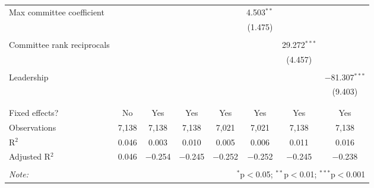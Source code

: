 \documentclass{article}
\begin{document}
\begin{table}[!htbp]
{{\begin{tabular}{@{\extracolsep{5pt}}lccccccc}
         Max committee coefficient &  &  &  &  & 4.503$^{**}$ &  &  \\ 
          &  &  &  &  & (1.475) &  &  \\ 
          & & & & & & & \\ 
         Committee rank reciprocals &  &  &  &  &  & 29.272$^{***}$ &  \\ 
          &  &  &  &  &  & (4.457) &  \\ 
          & & & & & & & \\ 
         Leadership &  &  &  &  &  &  & $-$81.307$^{***}$ \\ 
          &  &  &  &  &  &  & (9.403) \\ 
          & & & & & & & \\ 
        \hline \\[-1.8ex] 
        Fixed effects? & No & Yes & Yes & Yes & Yes & Yes & Yes \\ 
        Observations & 7,138 & 7,138 & 7,138 & 7,021 & 7,021 & 7,138 & 7,138 \\ 
        R$^{2}$ & 0.046 & 0.003 & 0.010 & 0.005 & 0.006 & 0.011 & 0.016 \\ 
        Adjusted R$^{2}$ & 0.046 & $-$0.254 & $-$0.245 & $-$0.252 & $-$0.252 & $-$0.245 & $-$0.238 \\ 
        \hline 
        \hline \\[-1.8ex] 
        \textit{Note:}  & \multicolumn{7}{r}{$^{*}$p$<$0.05; $^{**}$p$<$0.01; $^{***}$p$<$0.001} \\ 
        \end{tabular} 
    }}
  \end{table} 
\end{document}
